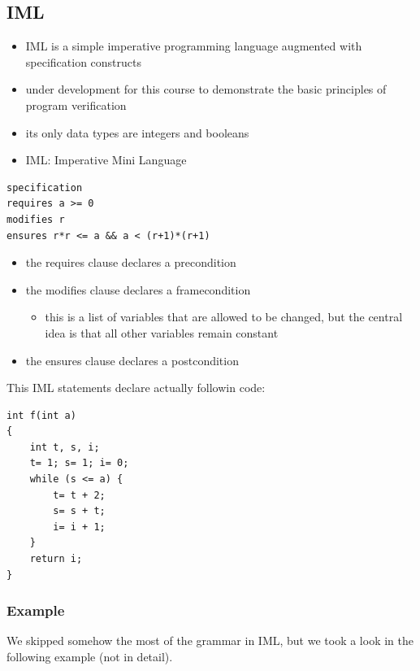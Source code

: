 \hypertarget{iml}{%
\subsection{IML}\label{iml}}

\begin{itemize}
\tightlist
\item
  IML is a simple imperative programming language augmented with
  specification constructs
\item
  under development for this course to demonstrate the basic principles
  of program verification
\item
  its only data types are integers and booleans
\item
  IML: Imperative Mini Language
\end{itemize}

\begin{lstlisting}
specification
requires a >= 0
modifies r
ensures r*r <= a && a < (r+1)*(r+1)
\end{lstlisting}

\begin{itemize}
\tightlist
\item
  the requires clause declares a precondition
\item
  the modifies clause declares a framecondition

  \begin{itemize}
  \tightlist
  \item
    this is a list of variables that are allowed to be changed, but the
    central idea is that all other variables remain constant
  \end{itemize}
\item
  the ensures clause declares a postcondition
\end{itemize}

This IML statements declare actually followin code:

\begin{lstlisting}
int f(int a)
{
    int t, s, i;
    t= 1; s= 1; i= 0;
    while (s <= a) {
        t= t + 2;
        s= s + t;
        i= i + 1;
    }
    return i;
}
\end{lstlisting}

\hypertarget{example}{%
\subsubsection{Example}\label{example}}

We skipped somehow the most of the grammar in IML, but we took a look in
the following example (not in detail).

